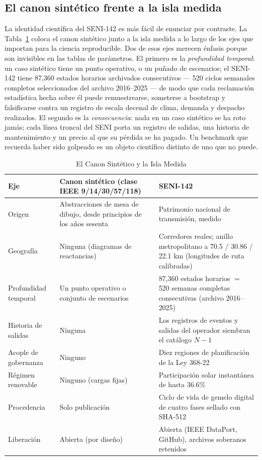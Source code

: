 \subsection{El canon sintético frente a la isla medida}
\label{sub:canon}

La identidad científica del SENI-142 es más fácil de enunciar por contraste. La Tabla~\ref{tab:canon} coloca el canon sintético junto a la isla medida a lo largo de los ejes que importan para la ciencia reproducible. Dos de esos ejes merecen énfasis porque son invisibles en las tablas de parámetros. El primero es la \emph{profundidad temporal}: un caso sintético tiene un punto operativo, o un puñado de escenarios; el SENI-142 tiene 87,360 estados horarios archivados consecutivos --- 520 ciclos semanales completos seleccionados del archivo 2016--2025 --- de modo que cada reclamación estadística hecha sobre él puede remuestrearse, someterse a bootstrap y falsificarse contra un registro de escala decenal de clima, demanda y despacho realizados. El segundo es la \emph{consecuencia}: nada en un caso sintético se ha roto jamás; cada línea troncal del SENI porta un registro de salidas, una historia de mantenimiento y un precio al que su pérdida se ha pagado. Un benchmark que recuerda haber sido golpeado es un objeto científico distinto de uno que no puede.

\begin{table}[!t]
\caption{El Canon Sintético y la Isla Medida}
\label{tab:canon}
\centering
\footnotesize
\begin{tabular}{@{}l p{} p{}@{}}
\toprule
\textbf{Eje} & \textbf{Canon sintético (clase IEEE 9/14/30/57/118)} & \textbf{SENI-142} \\
\midrule
Origen & Abstracciones de mesa de dibujo, desde principios de los años sesenta & Patrimonio nacional de transmisión, medido \\
Geografía & Ninguna (diagramas de reactancias) & Corredores reales; anillo metropolitano a 70.5 / 30.86 / 22.1 km (longitudes de ruta calibradas) \\
Profundidad temporal & Un punto operativo o conjunto de escenarios & 87,360 estados horarios $=$ 520 semanas completas consecutivas (archivo 2016--2025) \\
Historia de salidas & Ninguna & Los registros de eventos y salidas del operador siembran el catálogo $N-1$ \\
Acople de gobernanza & Ninguno & Diez regiones de planificación de la Ley 368-22 \\
Régimen renovable & Ninguno (cargas fijas) & Participación solar instantánea de hasta 36.6\% \\
Procedencia & Solo publicación & Ciclo de vida de gemelo digital de cuatro fases sellado con SHA-512 \\
Liberación & Abierta (por diseño) & Abierta (IEEE DataPort, GitHub), archivos soberanos retenidos \\
\bottomrule
\end{tabular}
\end{table}
